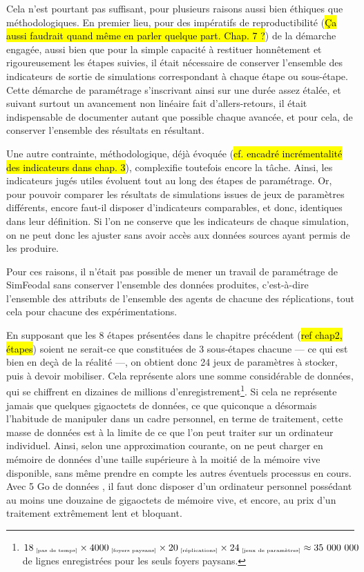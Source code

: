 	Cela n'est pourtant pas suffisant, pour plusieurs raisons aussi bien éthiques que méthodologiques.
	En premier lieu, pour des impératifs de reproductibilité (\hl{Ça aussi faudrait quand même en parler quelque part. Chap. 7 ?}) de la démarche engagée, aussi bien que pour la simple capacité à restituer honnêtement et rigoureusement les étapes suivies, il était nécessaire de conserver l'ensemble des indicateurs de sortie de simulations correspondant à chaque étape ou sous-étape.
	Cette démarche de paramétrage s'inscrivant ainsi sur une durée assez étalée, et suivant surtout un avancement non linéaire fait d'allers-retours, il était indispensable de documenter autant que possible chaque avancée, et pour cela, de conserver l'ensemble des résultats en résultant.

	Une autre contrainte, méthodologique, déjà évoquée (\hl{cf. encadré incrémentalité des indicateurs dans chap. 3}), complexifie toutefois encore la tâche.
	Ainsi, les indicateurs jugés utiles évoluent tout au long des étapes de paramétrage.
	Or, pour pouvoir comparer les résultats de simulations issues de jeux de paramètres différents, encore faut-il disposer d'indicateurs comparables, et donc, identiques dans leur définition.
	Si l'on ne conserve que les indicateurs de chaque simulation, on ne peut donc les ajuster sans avoir accès aux données sources ayant permis de les produire.

	Pour ces raisons, il n'était pas possible de mener un travail de paramétrage de SimFeodal sans conserver l'ensemble des données produites, c'est-à-dire l'ensemble des attributs de l'ensemble des agents de chacune des réplications, tout cela pour chacune des expérimentations.

	En supposant que les 8 étapes présentées dans le chapitre précédent (\hl{ref chap2, étapes}) soient ne serait-ce que constituées de 3 sous-étapes chacune --- ce qui est bien en deçà de la réalité ---, on obtient donc 24 jeux de paramètres à stocker, puis à devoir mobiliser.
	Cela représente alors une somme considérable de données, qui se chiffrent en dizaines de millions d'enregistrement\footnote{
	$18_{\text{\tiny ~[pas de temps]}} \times 4000_{\text{\tiny ~[foyers paysans]}} \times 20_{\text{\tiny ~[réplications]}} \times 24_{\text{\tiny ~[jeux de paramètres]}} \approx 35~000~000$ de lignes enregistrées pour les seuls foyers paysans.
	}.
	Si cela ne représente jamais que quelques gigaoctets de données, ce que quiconque a désormais l'habitude de manipuler dans un cadre personnel, en terme de traitement, cette masse de données est à la limite de ce que l'on peut traiter sur un ordinateur individuel.
	Ainsi, selon une approximation courante, on ne peut charger en mémoire de données d'une taille supérieure à la moitié de la mémoire vive disponible, sans même prendre en compte les autres éventuels processus en cours.
	Avec 5 Go de données , il faut donc disposer d'un ordinateur personnel possédant au moins une douzaine de gigaoctets de mémoire vive, et encore, au prix d'un traitement extrêmement lent et bloquant.

